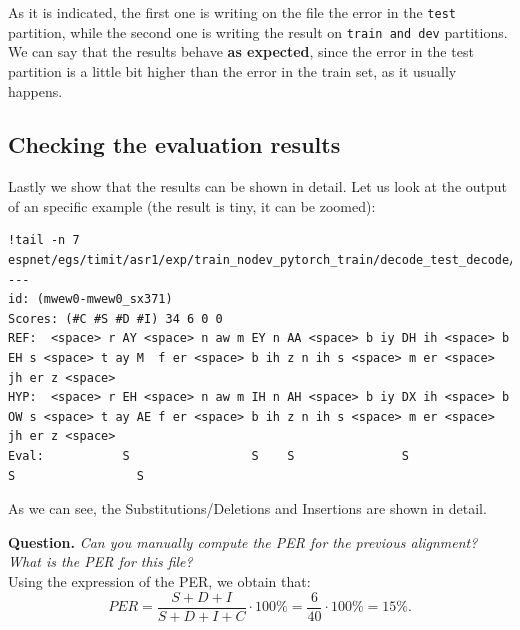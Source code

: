 \documentclass[a4paper]{article}
\def\inline{\lstinline[basicstyle=\ttfamily,keywordstyle={}]}
\begin{document}
As it is indicated, the first one is writing on the file the error in the \inline{test} partition, while the second one is writing the result on \inline{train and dev} partitions. We can say that the results behave \textbf{as expected}, since the error in the test partition is a little bit higher than the error in the train set, as it usually happens.
\subsection{Checking the evaluation results}

Lastly we show that the results can be shown in detail. Let us look at the output of an specific example (the result is tiny, it can be zoomed):

\begin{verbatim}
!tail -n 7 espnet/egs/timit/asr1/exp/train_nodev_pytorch_train/decode_test_decode/result.txt
---
id: (mwew0-mwew0_sx371)
Scores: (#C #S #D #I) 34 6 0 0
REF:  <space> r AY <space> n aw m EY n AA <space> b iy DH ih <space> b EH s <space> t ay M  f er <space> b ih z n ih s <space> m er <space> jh er z <space> 
HYP:  <space> r EH <space> n aw m IH n AH <space> b iy DX ih <space> b OW s <space> t ay AE f er <space> b ih z n ih s <space> m er <space> jh er z <space> 
Eval:           S                 S    S               S               S                 S                                                                  
\end{verbatim}
As we can see, the Substitutions/Deletions and Insertions are shown in detail.



\textbf{Question.} \emph{Can you manually compute the PER for the previous alignment? What is the PER for this file?}\\
Using the expression of the PER, we obtain that:
\[
  PER = \frac{S+D+I}{S + D + I + C}\cdot 100\% = \frac{6}{40} \cdot 100\% = 15\%.
\]

\printbibliography
\end{document}
